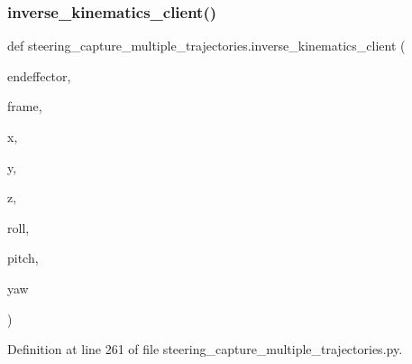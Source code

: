 \mbox{\label{namespacesteering__capture__multiple__trajectories_ad8355642b878dbeb866d47d4a9f453f2}} 
\subsubsection{\texorpdfstring{inverse\_kinematics\_client()}{inverse\_kinematics\_client()}}
{\footnotesize\ttfamily def steering\+\_\+capture\+\_\+multiple\+\_\+trajectories.\+inverse\+\_\+kinematics\+\_\+client (\begin{DoxyParamCaption}\item[{}]{endeffector,  }\item[{}]{frame,  }\item[{}]{x,  }\item[{}]{y,  }\item[{}]{z,  }\item[{}]{roll,  }\item[{}]{pitch,  }\item[{}]{yaw }\end{DoxyParamCaption})}



Definition at line 261 of file steering\+\_\+capture\+\_\+multiple\+\_\+trajectories.\+py.


